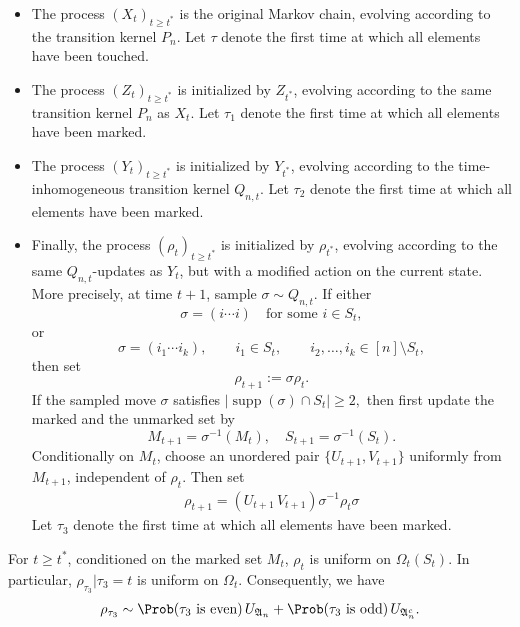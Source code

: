 \begin{itemize}
    \item The process $(X_t)_{t\geq t^*}$ is the original Markov chain, evolving according to the transition kernel \(P_n\). Let \(\tau\) denote the first time at which all elements have been touched.
    \item The process $(Z_t)_{t\geq t^*}$ is initialized by $Z_{t^*}$, evolving according to the same transition kernel \(P_n\) as $X_t$. Let \(\tau_1\) denote the first time at which all elements have been marked.
    \item The process $(Y_t)_{t\geq t^*}$ is initialized by $Y_{t^*}$, evolving according to the time-inhomogeneous transition kernel \(Q_{n,t}\). Let \(\tau_2\) denote the first time at which all elements have been marked.
    \item Finally, the process $(\rho_t)_{t\geq t^*}$ is initialized by $\rho_{t^*}$, evolving according to the same \(Q_{n,t}\)-updates as $Y_t$, but with a modified action on the current state. More precisely, at time \(t+1\), sample \(\sigma\sim Q_{n,t}\). If either
\[
    \sigma=(i\cdots i)\quad \text{for some } i\in S_t,
\]
or
\[
    \sigma=(i_1\cdots i_k),\qquad i_1\in S_t,\qquad
    i_2,\ldots,i_k\in [n]\setminus S_t,
\]
then set
\[
    \rho_{t+1}:=\sigma\rho_t.
\]
If the sampled move \(\sigma\) satisfies $|\operatorname{supp}(\sigma)\cap S_t|\ge 2,$ then first update the marked and the unmarked set by 
\[
M_{t+1} = \sigma^{-1}(M_t),\quad S_{t+1} = \sigma^{-1}(S_t).
\]
Conditionally on $M_t$, choose an unordered pair $\{U_{t+1},V_{t+1}\}$ uniformly from $M_{t+1}$, independent of $\rho_t$. Then set 
\begin{align*}
    \rho_{t+1} = (U_{t+1}\,V_{t+1})\sigma^{-1}\rho_t\sigma
\end{align*}
Let \(\tau_3\) denote the first time at which all elements have been marked.
\end{itemize}
\begin{lemma}
For $t \geq t^*$, conditioned on the marked set $M_t$, $\rho_t$ is uniform on $\Omega_{t}(S_t)$. In particular, $\rho_{\tau_3}|\tau_3= t$ is uniform on $\Omega_t$. Consequently, we have
\begin{align*}
    \rho_{\tau_3}\sim \Prob(\tau_3\text{ is even})\, U_{\mathfrak{A}_n}+\Prob(\tau_3\text{ is odd})\, U_{\mathfrak{A}_n^c}.
\end{align*}
\end{lemma}

